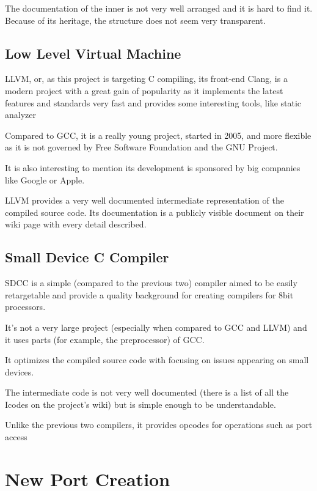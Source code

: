     The documentation of the inner %
    is not very well arranged and it is hard to find it. Because of its heritage, the structure does not seem very transparent.

    \section{Low Level Virtual Machine}

    LLVM, or, as this project is targeting C compiling, its front-end Clang, is a modern project with a great gain of popularity as it implements the latest features and standards very fast and provides some interesting tools, like static analyzer

    Compared to GCC, it is a really young project, started in 2005, and more flexible as it is not governed by Free Software Foundation and the GNU Project.

    It is also interesting to mention its development is sponsored by big companies like Google or Apple.

    LLVM provides a very well documented intermediate representation of the compiled source code. Its documentation is a publicly visible document on their wiki page with every detail described.

    \section{Small Device C Compiler}

    SDCC is a simple (compared to the previous two) compiler aimed to be easily retargetable and provide a quality background for creating compilers for 8bit processors.

    It's not a very large project (especially when compared to GCC and LLVM) and it uses parts (for example, the preprocessor) of GCC.

    It optimizes the compiled source code with focusing on issues appearing on small devices.

    The intermediate code is not very well documented (there is a list of all the Icodes on the project's wiki) but is simple enough to be understandable.

    Unlike the previous two compilers, it provides opcodes for operations such as port access %
    

\chapter{New Port Creation}\label{port}

